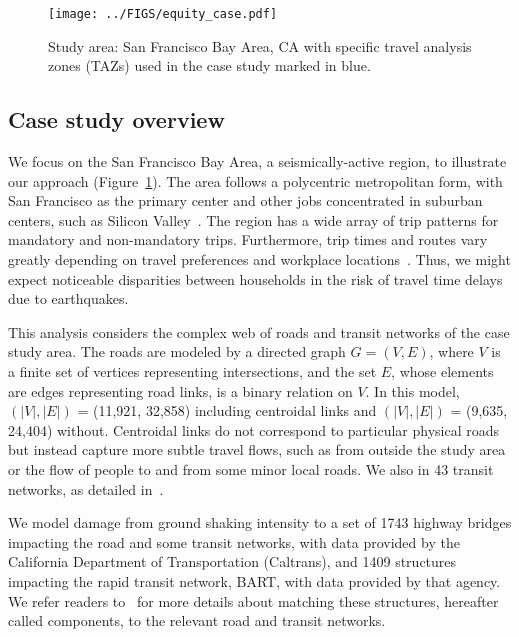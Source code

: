 \begin{figure}
\centering
\texttt{[image: ../FIGS/equity\_case.pdf]} 
\caption{Study area: San Francisco Bay Area, CA with specific travel analysis zones (TAZs) used in the case study marked in blue.}
\label{fig:equity_study_area}
\end{figure}

\subsection{Case study overview}
We focus on the San Francisco Bay Area, a seismically-active region, to illustrate our approach (Figure~\ref{fig:equity_study_area}). The area follows a polycentric metropolitan form, with San Francisco as the primary center and other jobs  concentrated in suburban centers, such as Silicon Valley~\cite{cervero_polycentrism_1997}. The region has a wide array of trip patterns for mandatory and non-mandatory trips. Furthermore, trip times and routes vary greatly depending on travel preferences and workplace locations~\cite{cervero_polycentrism_1997}. Thus,  we might expect noticeable disparities between households in the risk of travel time delays due to earthquakes. 

This analysis considers the complex web of roads and transit networks of the case study area. The roads are modeled by a directed graph $G = (V, E)$, where $V$ is a finite set of vertices representing intersections, and the set $E$, whose elements are edges representing road links, is a binary relation on $V$. In this model, $(|V|, |E|)$ = (11,921, 32,858) including centroidal links and $(|V|, |E|)$ = (9,635, 24,404) without. Centroidal links do not correspond to particular physical roads but instead capture more subtle travel flows, such as  from outside the study area or the flow of people to and from some minor local roads. We also in 43 transit networks, as detailed in~\cite{miller_seismic_2014}.

We  model damage from ground shaking intensity to a set of 1743 highway bridges impacting the road and some transit networks, with data provided by the California Department of Transportation (Caltrans), and 1409 structures impacting the rapid transit network, BART, with data provided by that agency. We refer readers to~\cite{miller_seismic_2014} for more details about matching these structures, hereafter called components, to the relevant road and transit networks. 
%


